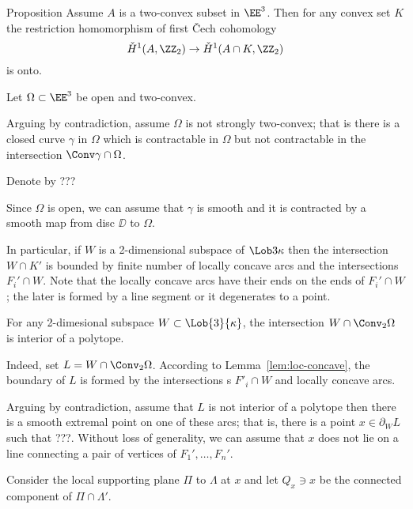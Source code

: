 
\begin{thm}{Proposition}\label{prop:stong-two-convex}
Assume $A$ is a  two-convex subset in $\EE^3$.
Then for any convex set $K$ the restriction homomorphism of first \v{C}ech cohomology
\[\check{H}^1(A,\ZZ_2)\to \check{H}^1(A\cap K,\ZZ_2)\]
is onto.
\end{thm}

Let $\Omega\subset \EE^3$ be open and two-convex.

Arguing by contradiction, assume $\Omega$ is not strongly two-convex;
that is there is a closed curve $\gamma$
in $\Omega$ 
which is contractable in $\Omega$ but not contractable in the intersection $\Conv\gamma\cap \Omega$.

Denote by ???

Since $\Omega$ is open, 
we can assume that $\gamma$ is smooth
and it is contracted by a smooth map from disc $\DD$ to $\Omega$.

 
\qeds













In particular, if $W$ is a 2-dimensional subspace of $\Lob3\kappa$ 
then the intersection $W\cap K'$ is bounded 
by finite number of locally concave arcs and the  intersections $F_i'\cap W$.
Note that the locally concave arcs have their ends on the ends of $F_i'\cap W$;
the later is formed by a line segment or it degenerates to a point.

\begin{clm}{}\label{clm:intersection-is-polytope}
For any 2-dimesional subspace $W\subset\Lob{3}{\kappa}$,
the intersection $W\cap \Conv_2 \Omega$ is interior of a polytope.
\end{clm}

Indeed, set $L=W\cap \Conv_2 \Omega$.
According to Lemma~\ref{lem:loc-concave}, 
the boundary of $L$ is formed by the intersections s $F'_i\cap W$
and locally concave arcs.

Arguing by contradiction, 
assume that $L$ is not interior of a polytope then there is a smooth extremal point on one of these arcs; 
that is, there is a point $x\in\partial_W L$ such that ???.
Without loss of generality, we can assume that $x$ does not lie on a line connecting a pair of vertices of $F_1',\dots,F_n'$.

Consider the local supporting plane $\Pi$ to $\Lambda$ at $x$
and let $Q_x\ni x$ be the connected component of $\Pi\cap\Lambda'$.


